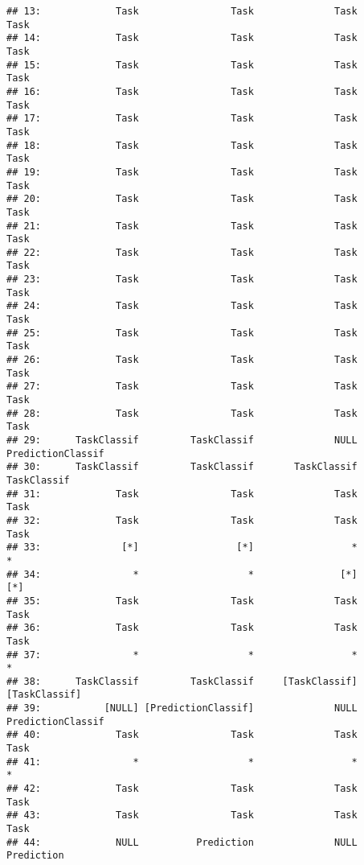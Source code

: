 \documentclass[
]{scrbook}
\begin{document}
\begin{verbatim}
## 13:             Task                Task              Task                Task
## 14:             Task                Task              Task                Task
## 15:             Task                Task              Task                Task
## 16:             Task                Task              Task                Task
## 17:             Task                Task              Task                Task
## 18:             Task                Task              Task                Task
## 19:             Task                Task              Task                Task
## 20:             Task                Task              Task                Task
## 21:             Task                Task              Task                Task
## 22:             Task                Task              Task                Task
## 23:             Task                Task              Task                Task
## 24:             Task                Task              Task                Task
## 25:             Task                Task              Task                Task
## 26:             Task                Task              Task                Task
## 27:             Task                Task              Task                Task
## 28:             Task                Task              Task                Task
## 29:      TaskClassif         TaskClassif              NULL   PredictionClassif
## 30:      TaskClassif         TaskClassif       TaskClassif         TaskClassif
## 31:             Task                Task              Task                Task
## 32:             Task                Task              Task                Task
## 33:              [*]                 [*]                 *                   *
## 34:                *                   *               [*]                 [*]
## 35:             Task                Task              Task                Task
## 36:             Task                Task              Task                Task
## 37:                *                   *                 *                   *
## 38:      TaskClassif         TaskClassif     [TaskClassif]       [TaskClassif]
## 39:           [NULL] [PredictionClassif]              NULL   PredictionClassif
## 40:             Task                Task              Task                Task
## 41:                *                   *                 *                   *
## 42:             Task                Task              Task                Task
## 43:             Task                Task              Task                Task
## 44:             NULL          Prediction              NULL          Prediction

\end{verbatim}
\end{document}
